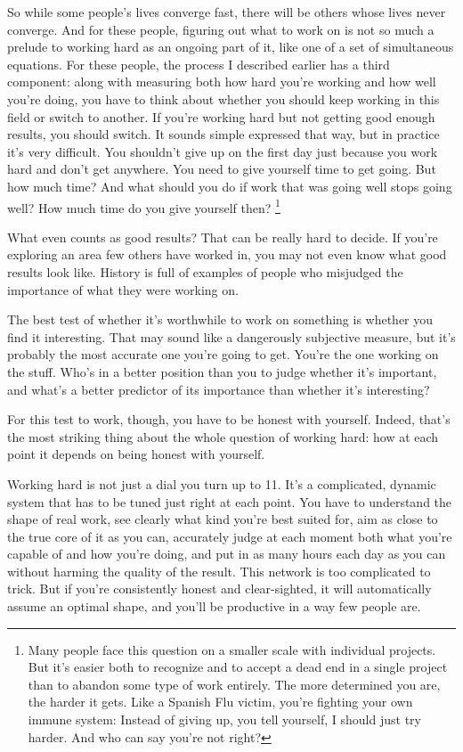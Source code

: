 \documentclass[12pt]{book}
\begin{document}
So while some people's lives converge fast, there will be others whose
lives never converge. And for these people, figuring out what to work on
is not so much a prelude to working hard as an ongoing part of it, like
one of a set of simultaneous equations. For these people, the process I
described earlier has a third component: along with measuring both how
hard you're working and how well you're doing, you have to think about
whether you should keep working in this field or switch to another. If
you're working hard but not getting good enough results, you should
switch. It sounds simple expressed that way, but in practice it's very
difficult. You shouldn't give up on the first day just because you work
hard and don't get anywhere. You need to give yourself time to get
going. But how much time? And what should you do if work that was going
well stops going well? How much time do you give yourself then?
\footnote{Many people face this question on a smaller scale with
individual projects. But it's easier both to recognize and to accept a
dead end in a single project than to abandon some type of work entirely.
The more determined you are, the harder it gets. Like a Spanish Flu
victim, you're fighting your own immune system: Instead of giving up,
you tell yourself, I should just try harder. And who can say you're not
right?}

What even counts as good results? That can be really hard to decide. If
you're exploring an area few others have worked in, you may not even
know what good results look like. History is full of examples of people
who misjudged the importance of what they were working on.

The best test of whether it's worthwhile to work on something is whether
you find it interesting. That may sound like a dangerously subjective
measure, but it's probably the most accurate one you're going to get.
You're the one working on the stuff. Who's in a better position than you
to judge whether it's important, and what's a better predictor of its
importance than whether it's interesting?

For this test to work, though, you have to be honest with yourself.
Indeed, that's the most striking thing about the whole question of
working hard: how at each point it depends on being honest with
yourself.

Working hard is not just a dial you turn up to 11. It's a complicated,
dynamic system that has to be tuned just right at each point. You have
to understand the shape of real work, see clearly what kind you're best
suited for, aim as close to the true core of it as you can, accurately
judge at each moment both what you're capable of and how you're doing,
and put in as many hours each day as you can without harming the quality
of the result. This network is too complicated to trick. But if you're
consistently honest and clear-sighted, it will automatically assume an
optimal shape, and you'll be productive in a way few people are.
\end{document}
